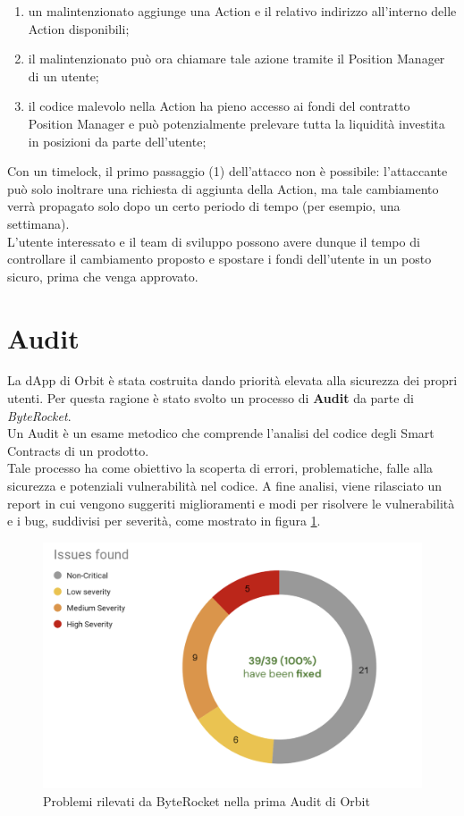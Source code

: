 \documentclass[12pt,a4paper]{report}
\begin{document}
\begin{enumerate}
    \item un malintenzionato aggiunge una Action e il relativo indirizzo all'interno delle Action disponibili;
    \item il malintenzionato può ora chiamare tale azione tramite il Position Manager di un utente;
    \item il codice malevolo nella Action ha pieno accesso ai fondi del contratto Position Manager e può potenzialmente prelevare tutta la liquidità investita in posizioni da parte dell'utente;
\end{enumerate}

\noindent Con un timelock, il primo passaggio (1) dell'attacco non è possibile: l'attaccante può solo inoltrare una richiesta di aggiunta della Action, ma tale cambiamento verrà propagato solo dopo un certo periodo di tempo (per esempio, una settimana).\\L'utente interessato e il team di sviluppo possono avere dunque il tempo di controllare il cambiamento proposto e spostare i fondi dell'utente in un posto sicuro, prima che venga approvato.


\section{Audit}

La dApp di Orbit è stata costruita dando priorità elevata alla sicurezza dei propri utenti. Per questa ragione è stato svolto un processo di \textbf{Audit}\cite{audit} da parte di \textit{ByteRocket}.
\\Un Audit è un esame metodico che comprende l'analisi del codice degli Smart Contracts di un prodotto. \\Tale processo ha come obiettivo la scoperta di errori, problematiche, falle alla sicurezza e potenziali vulnerabilità nel codice. A fine analisi, viene rilasciato un report in cui vengono suggeriti miglioramenti e modi per risolvere le vulnerabilità e i bug, suddivisi per severità, come mostrato in figura \ref{fig:audit}. 

\begin{figure}[H]
  \includegraphics[scale=0.40]{audit.png}
  \centering
  \caption{Problemi rilevati da ByteRocket nella prima Audit di Orbit}
  \label{fig:audit}
\end{figure}
\end{document}
